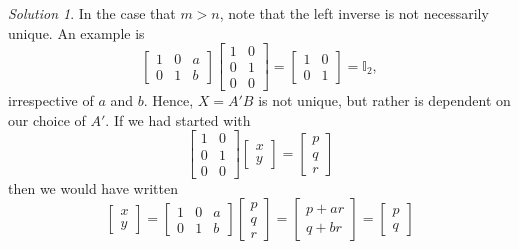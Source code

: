 \documentclass[11pt]{report}
\theoremstyle{remark}
\newtheorem*{solution}{Solution}
\begin{document}
    \begin{solution}
        In the case that $m > n$, note that the left inverse is not necessarily
        unique. An example is \[
            \begin{bmatrix}
                1 & 0 & a \\ 0 & 1 & b
            \end{bmatrix} \begin{bmatrix}
                1 & 0 \\ 0 & 1 \\ 0 & 0
            \end{bmatrix} = \begin{bmatrix}
                1 & 0 \\ 0 & 1
            \end{bmatrix} = \mathbb{I}_2,
        \] irrespective of $a$ and $b$. Hence, $X = A'B$ is not unique, but rather
        is dependent on our choice of $A'$. If we had started with \[
            \begin{bmatrix}
                1 & 0 \\ 0 & 1 \\ 0 & 0
            \end{bmatrix} \begin{bmatrix}
                x \\ y
            \end{bmatrix} = \begin{bmatrix}
                p \\ q \\ r
            \end{bmatrix}
        \] then we would have written \[
            \begin{bmatrix}
                x \\ y
            \end{bmatrix} = \begin{bmatrix}
                1 & 0 & a \\ 0 & 1 & b
            \end{bmatrix} \begin{bmatrix}
                p \\ q \\ r
            \end{bmatrix} = \begin{bmatrix}
                p + ar \\ q + br
            \end{bmatrix} = \begin{bmatrix}
                p \\ q

\end{bmatrix}\]
\end{solution}
\end{document}

